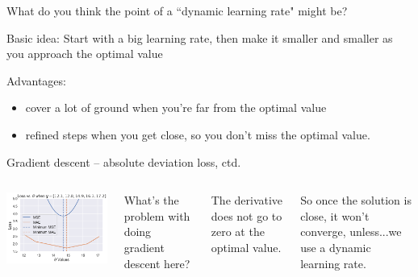 \documentclass[aspectratio=169, handout]{beamer}
\begin{document}
\begin{frame}{What do you think the point of a ``dynamic learning rate" might be?}

\pause

Basic idea: Start with a big learning rate, then make it smaller and smaller as you approach the optimal value

\pause

\vspace{10mm}

Advantages: 
\begin{itemize}
\item cover a lot of ground when you're far from the optimal value
\item refined steps when you get close, so you don't miss the optimal value.
\end{itemize}

\end{frame}


\begin{frame}{Gradient descent -- absolute deviation loss, ctd.}

\begin{columns}
  \includegraphics[width=\textwidth]{mae_vs_mse}


What's the problem with doing gradient descent here?

\vspace{5mm}

\pause

The derivative does not go to zero at the optimal value.  

\vspace{5mm}

So once the solution is close, it won't converge, unless...\pause we use a dynamic learning rate.
\end{columns}

\end{frame}
\end{document}

